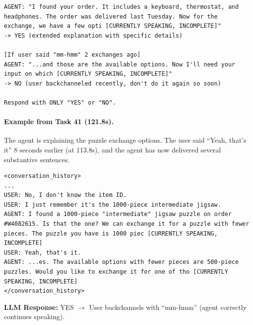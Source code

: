 \begin{lstlisting}
AGENT: "I found your order. It includes a keyboard, thermostat, and headphones. The order was delivered last Tuesday. Now for the exchange, we have a few opti [CURRENTLY SPEAKING, INCOMPLETE]"
-> YES (extended explanation with specific details)

[If user said "mm-hmm" 2 exchanges ago]
AGENT: "...and those are the available options. Now I'll need your input on which [CURRENTLY SPEAKING, INCOMPLETE]"
-> NO (user backchanneled recently, don't do it again so soon)

Respond with ONLY "YES" or "NO".
\end{lstlisting}

\paragraph{Example from Task 41 (121.8s).} The agent is explaining the puzzle exchange options. The user said ``Yeah, that's it'' 8 seconds earlier (at 113.8s), and the agent has now delivered several substantive sentences.

\begin{lstlisting}
<conversation_history>
...
USER: No, I don't know the item ID.
USER: I just remember it's the 1000-piece intermediate jigsaw.
AGENT: I found a 1000-piece "intermediate" jigsaw puzzle on order #W4082615. Is that the one? We can exchange it for a puzzle with fewer pieces. The puzzle you have is 1000 piec [CURRENTLY SPEAKING, INCOMPLETE]
USER: Yeah, that's it.
AGENT: ...es. The available options with fewer pieces are 500-piece puzzles. Would you like to exchange it for one of tho [CURRENTLY SPEAKING, INCOMPLETE]
</conversation_history>
\end{lstlisting}

\noindent\textbf{LLM Response:} YES $\rightarrow$ User backchannels with ``mm-hmm'' (agent correctly continues speaking).
